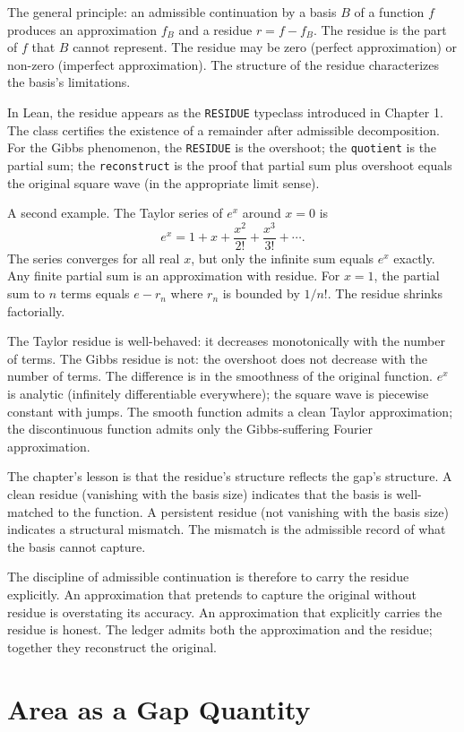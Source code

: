 The general principle: an admissible continuation by a basis $B$
of a function $f$ produces an approximation $f_B$ and a residue
$r = f - f_B$. The residue is the part of $f$ that $B$ cannot
represent. The residue may be zero (perfect approximation) or
non-zero (imperfect approximation). The structure of the residue
characterizes the basis's limitations.

In Lean, the residue appears as the \texttt{RESIDUE} typeclass
introduced in Chapter 1. The class certifies the existence of a
remainder after admissible decomposition. For the Gibbs phenomenon,
the \texttt{RESIDUE} is the overshoot; the \texttt{quotient} is
the partial sum; the \texttt{reconstruct} is the proof that
partial sum plus overshoot equals the original square wave (in
the appropriate limit sense).

A second example. The Taylor series of $e^x$ around $x = 0$ is
\[
e^x = 1 + x + \frac{x^2}{2!} + \frac{x^3}{3!} + \cdots.
\]
The series converges for all real $x$, but only the infinite sum
equals $e^x$ exactly. Any finite partial sum is an approximation
with residue. For $x = 1$, the partial sum to $n$ terms equals
$e - r_n$ where $r_n$ is bounded by $1/n!$. The residue shrinks
factorially.

The Taylor residue is well-behaved: it decreases monotonically
with the number of terms. The Gibbs residue is not: the overshoot
does not decrease with the number of terms. The difference is in
the smoothness of the original function. $e^x$ is analytic
(infinitely differentiable everywhere); the square wave is
piecewise constant with jumps. The smooth function admits a
clean Taylor approximation; the discontinuous function admits
only the Gibbs-suffering Fourier approximation.

The chapter's lesson is that the residue's structure reflects the
gap's structure. A clean residue (vanishing with the basis size)
indicates that the basis is well-matched to the function. A
persistent residue (not vanishing with the basis size) indicates
a structural mismatch. The mismatch is the admissible record of
what the basis cannot capture.

The discipline of admissible continuation is therefore to carry
the residue explicitly. An approximation that pretends to capture
the original without residue is overstating its accuracy. An
approximation that explicitly carries the residue is honest. The
ledger admits both the approximation and the residue; together
they reconstruct the original.

\section{Area as a Gap Quantity}
\label{se:area-as-a-gap-quantity}

